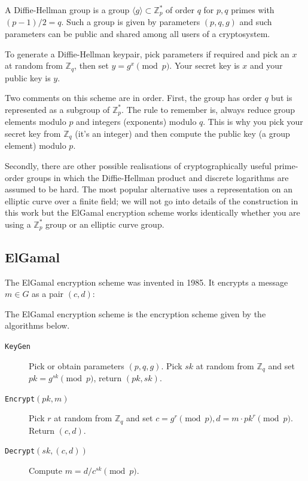 \documentclass[envcountsame]{llncs}
\newcommand{\alg}[1]{\textup{\texttt{#1}}}
\begin{document}
\begin{definition}
A Diffie-Hellman group is a group $\langle g \rangle \subset \mathbb Z^*_p$ of
order $q$ for $p, q$ primes with $(p-1)/2 = q$. Such a group is given by
parameters $(p, q, g)$ and such parameters can be public and shared among all
users of a cryptosystem.

To generate a Diffie-Hellman keypair, pick parameters if required and pick an
$x$ at random from $\mathbb Z_q$, then set $y = g^x \pmod{p}$. Your secret key
is $x$ and your public key is $y$.
\end{definition}

Two comments on this scheme are in order. First, the group has order $q$ but is
represented as a subgroup of $\mathbb Z^*_p$.
The rule to
remember is, always reduce group elements modulo $p$ and integers (exponents)
modulo $q$. This is why you pick your secret key from $\mathbb Z_q$ (it's an
integer) and then compute the public key (a group element) modulo $p$.

Secondly, there are other possible realisations of cryptographically useful
prime-order groups in which the Diffie-Hellman product and discrete logarithms
are assumed to be hard. The most popular alternative uses a representation on an
elliptic curve over a finite field; we will not go into details of the
construction in this work but the ElGamal encryption scheme works identically
whether you are using a $\mathbb Z^*_p$ group or an elliptic curve group.

\subsection{ElGamal}

The ElGamal encryption scheme \cite{E85} was invented in 1985.
It encrypts a message $m \in G$ as a pair $(c, d)$:

\begin{definition}
The ElGamal encryption scheme is the encryption scheme given by the algorithms below.
\end{definition}
\begin{description}

\item[\alg{KeyGen}] Pick or obtain parameters $(p, q, g)$. Pick $sk$ at random
from $\mathbb Z_q$ and set $pk = g^{sk} \pmod{p}$, return $(pk, sk)$.

\item[\alg{Encrypt}$(pk, m)$] Pick $r$ at random from $\mathbb Z_q$ and set
$c = g^r \pmod{p}, d = m \cdot pk^r \pmod{p}$. Return $(c, d)$.

\item[\alg{Decrypt}$(sk, (c, d))$] Compute $m = d / c^{sk} \pmod{p}$.
\end{description}
\end{document}
